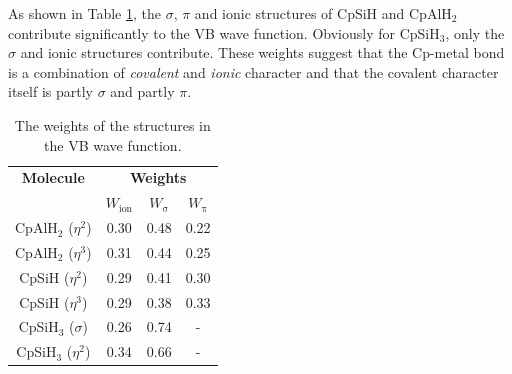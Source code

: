 As shown in Table \ref{ch4.tab.weights}, the $\sigma$, $\pi$ and ionic structures of CpSiH and CpAlH$_2$ contribute significantly to the VB wave function. Obviously for CpSiH$_3$, only the $\sigma$ and ionic structures contribute. These weights suggest that the Cp-metal bond is a combination of \textit{covalent} and \textit{ionic} character and that the covalent character itself is partly $\sigma$ and partly $\pi$.
\begin{table}[htbp]
\caption{The weights \cite{coulson} of the structures in the VB wave function.}
\center
\begin{tabular}{|c|ccc|}
\hline
\textbf{Molecule}&
\multicolumn{3}{c|}{\textbf{Weights}}\\
&$W_\mathrm{ion}$&
$W_\mathrm{\sigma}$&
$W_\mathrm{\pi}$\\
\hline
CpAlH$_2$ ($\eta^{2}$)&0.30&0.48&0.22\\
CpAlH$_2$ ($\eta^{3}$)&0.31&0.44&0.25\\
CpSiH ($\eta^{2}$)&0.29&0.41&0.30\\
CpSiH ($\eta^{3}$)&0.29&0.38&0.33\\
CpSiH$_3$ ($\sigma$)&0.26&0.74&-\\
CpSiH$_3$ ($\eta^{2}$)&0.34&0.66&-\\
\hline
\end{tabular}
\label{ch4.tab.weights}
\end{table}

